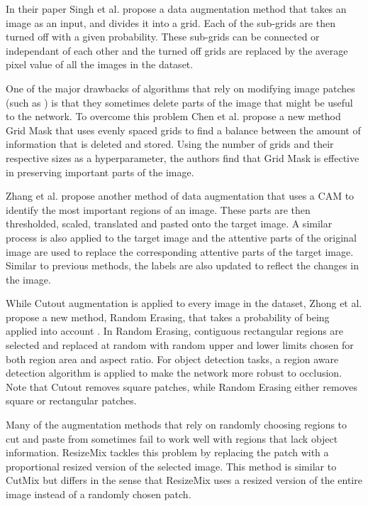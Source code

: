 In their paper Singh et al. \cite{singhHideandSeekDataAugmentation2018} propose a data augmentation method that takes an image as an input, and divides it into a grid. Each of the sub-grids are then turned off with a given probability. These sub-grids can be connected or independant of each other and the turned off grids are replaced by the average pixel value of all the images in the dataset.

One of the major drawbacks of algorithms that rely on modifying image patches (such as \cite{singhHideandSeekDataAugmentation2018,devriesImprovedRegularizationConvolutional2017,zhongRandomErasingData2020}) is that they sometimes delete parts of the image that might be useful to the network. To overcome this problem Chen et al. propose a new method Grid Mask \cite{chenGridMaskDataAugmentation2020} that uses evenly spaced grids to find a balance between the amount of information that is deleted and stored. Using the number of grids and their respective sizes as a hyperparameter, the authors find that Grid Mask is effective in preserving important parts of the image.

Zhang et al. propose another method of data augmentation that uses a CAM \cite{zhouLearningDeepFeatures2016} to identify the most important regions of an image. These parts are then thresholded, scaled, translated and pasted onto the target image. A similar process is also applied to the target image and the attentive parts of the original image are used to replace the corresponding attentive parts of the target image. Similar to previous methods, the labels are also updated to reflect the changes in the image.

While Cutout augmentation \cite{devriesImprovedRegularizationConvolutional2017} is applied to every image in the dataset, Zhong et al. propose a new method, Random Erasing, that takes a probability of being applied into account \cite{zhongRandomErasingData2020}. In Random Erasing, contiguous rectangular regions are selected and replaced at random with random upper and lower limits chosen for both region area and aspect ratio. For object detection tasks, a region aware detection algorithm is applied to make the network more robust to occlusion. Note that Cutout removes square patches, while Random Erasing either removes square or rectangular patches.

Many of the augmentation methods that rely on randomly choosing regions to cut and paste from sometimes fail to work well with regions that lack object information. ResizeMix \cite{qinResizeMixMixingData2020} tackles this problem by replacing the patch with a proportional resized version of the selected image. This method is similar to CutMix \cite{yunCutMixRegularizationStrategy2019} but differs in the sense that ResizeMix uses a resized version of the entire image instead of a randomly chosen patch.

